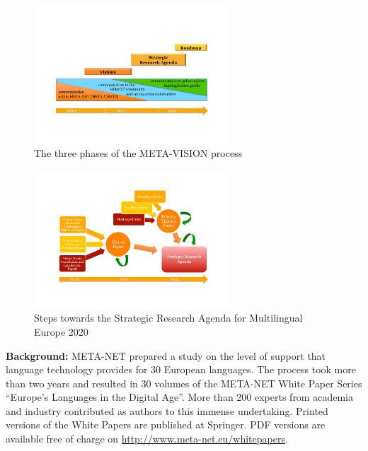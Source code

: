 \documentclass[10pt, plain]{../../metanetpaper}
\begin{document}
\begin{figure}[htb]
  \center
  \includegraphics[width=0.65\textwidth]{../_media/Timeline}
  \caption{The three phases of the META-VISION process}
  \label{fig:sra-timeline}
\end{figure}
 
\begin{figure}[htb]
  \center
  \includegraphics[width=0.65\textwidth]{../_media/Towards-SRA}
  \caption{Steps towards the Strategic Research Agenda for Multilingual Europe 2020}
  \label{fig:towards-sra}
\end{figure}

\clearpage


\label{lwp-campaign}


\textbf{Background:} META-NET prepared a study on the level of support that language technology provides for 30 European languages. The process took more than two years and resulted in 30 volumes of the META-NET White Paper Series “Europe’s Languages in the Digital Age”. More than 200 experts from academia and industry contributed as authors to this immense undertaking. Printed versions of the White Papers are published at Springer. PDF versions are available free of charge on \url{http://www.meta-net.eu/whitepapers}.
\end{document}
